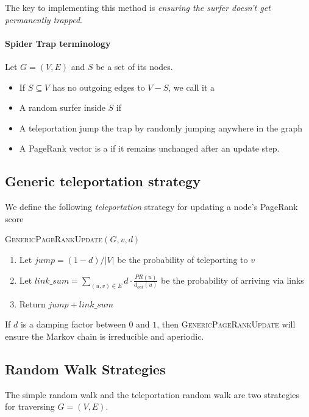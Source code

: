 \documentclass[11pt]{exam}
\begin{document}
The key to implementing this method is \emph{ensuring the surfer doesn't get permanently trapped}.\\

\paragraph{Spider Trap terminology}
Let $G = (V,E)$ and $S$ be a set of its nodes.
\begin{itemize}
	\item If $S \subseteq V$ has no outgoing edges to $V-S$, we call it a \\
	\item A random surfer  inside $S$ if  \\
	\item A teleportation jump  the trap by randomly jumping anywhere in the graph\\
	\item A PageRank vector is a  if it remains unchanged after an update step. 
\end{itemize}

\newpage
\subsection{Generic teleportation strategy}
We define the following \emph{teleportation} strategy for updating a node's PageRank score

\textsc{GenericPageRankUpdate}$(G,v,d)$
\begin{enumerate}
	\item Let $jump = (1-d) / |V|$ be the probability of teleporting to $v$
	\item Let $link\_sum = \sum_{(u,v) \in E} d \cdot \frac{PR(u)}{d_{out}(u)}$ be the probability of arriving via links
	\item Return $jump + link\_sum$
\end{enumerate}
\begin{lemma}
	If $d$ is a damping factor between $0$ and $1$, then \textsc{GenericPageRankUpdate} will ensure the Markov chain is irreducible and aperiodic.
\end{lemma}


\newpage

\subsection{Random Walk Strategies}
The simple random walk and the teleportation random walk are two strategies for traversing $G = (V,E)$.\\
\end{document}

